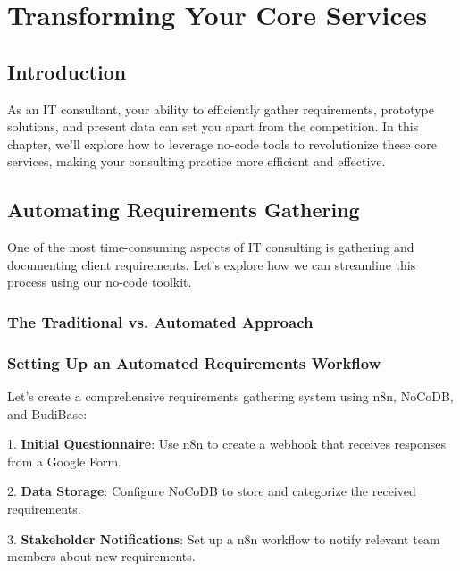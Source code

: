 \chapter{Transforming Your Core Services}

\section{Introduction}

As an IT consultant, your ability to efficiently gather requirements, prototype solutions, and present data can set you apart from the competition. In this chapter, we'll explore how to leverage no-code tools to revolutionize these core services, making your consulting practice more efficient and effective.

\section{Automating Requirements Gathering}

One of the most time-consuming aspects of IT consulting is gathering and documenting client requirements. Let's explore how we can streamline this process using our no-code toolkit.

\subsection{The Traditional vs. Automated Approach}


\subsection{Setting Up an Automated Requirements Workflow}

Let's create a comprehensive requirements gathering system using n8n, NoCoDB, and BudiBase:

1. \textbf{Initial Questionnaire}: Use n8n to create a webhook that receives responses from a Google Form.


2. \textbf{Data Storage}: Configure NoCoDB to store and categorize the received requirements.


3. \textbf{Stakeholder Notifications}: Set up a n8n workflow to notify relevant team members about new requirements.

